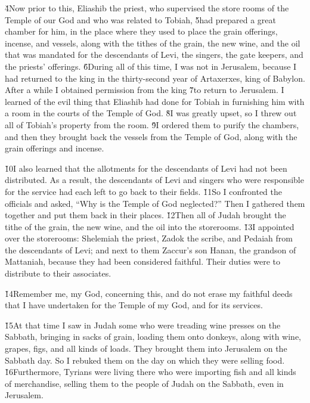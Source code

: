 \v{4}Now prior to this, Eliashib the priest, who supervised the store rooms of the Temple of our God and who was related to Tobiah, \v{5}had prepared a great chamber for him, in the place where they used to place the grain offerings, incense, and vessels, along with the tithes of the grain, the new wine, and the oil that was mandated for the descendants of Levi, the singers, the gate keepers, and the priests' offerings. \v{6}During all of this time, I was not in Jerusalem, because I had returned to the king in the thirty-second year of Artaxerxes, king of Babylon. After a while I obtained permission from the king \v{7}to return to Jerusalem. I learned of the evil thing that Eliashib had done for Tobiah in furnishing him with a room in the courts of the Temple of God. \v{8}I was greatly upset, so I threw out all of Tobiah's property from the room. \v{9}I ordered them to purify the chambers, and then they brought back the vessels from the Temple of God, along with the grain offerings and incense.

\v{10}I also learned that the allotments for the descendants of Levi had not been distributed. As a result, the descendants of Levi and singers who were responsible for the service had each left to go back to their fields. \v{11}So I confronted the officials and asked, ``Why is the Temple of God neglected?'' Then I gathered them together and put them back in their places. \v{12}Then all of Judah brought the tithe of the grain, the new wine, and the oil into the storerooms. \v{13}I appointed over the storerooms: Shelemiah the priest, Zadok the scribe, and Pedaiah from the descendants of Levi; and next to them Zaccur's son Hanan, the grandson of Mattaniah, because they had been considered faithful. Their duties were to distribute to their associates.

\v{14}Remember me, my God, concerning this, and do not erase my faithful deeds that I have undertaken for the Temple of my God, and for its services.

\v{15}At that time I saw in Judah some who were treading wine presses on the Sabbath, bringing in sacks of grain, loading them onto donkeys, along with wine, grapes, figs, and all kinds of loads. They brought them into Jerusalem on the Sabbath day. So I rebuked them on the day on which they were selling food. \v{16}Furthermore, Tyrians were living there who were importing fish and all kinds of merchandise, selling them to the people of Judah on the Sabbath, even in Jerusalem.

